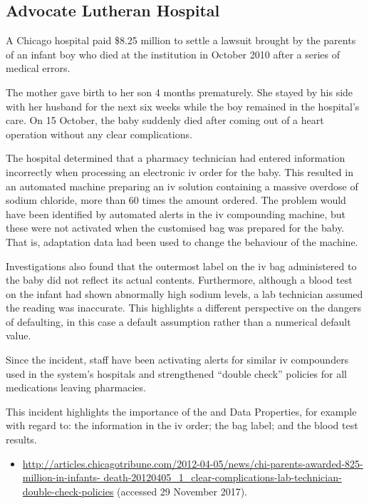 \subsection{Advocate Lutheran Hospital} \label{bkm:incacc:advocatelutheran}
A Chicago hospital paid \$8.25 million to settle a lawsuit brought by the parents of an infant boy who died at the institution in October 2010 after a series of medical errors.

The mother gave birth to her son 4 months prematurely. She stayed by his side with her husband for the next six weeks while the boy remained in the hospital's care. On 15 October, the baby suddenly died after coming out of a heart operation without any clear complications.

The hospital determined that a pharmacy technician had entered \gls{information} incorrectly when processing an electronic \gls{iv} order for the baby. This resulted in an automated machine preparing an \gls{iv} solution containing a massive overdose of sodium chloride, more than 60 times the amount ordered. The problem would have been identified by automated alerts in the \gls{iv} compounding machine, but these were not activated when the customised bag was prepared for the baby. That is, \gls{adaptation data} had been used to change the behaviour of the machine.

Investigations also found that the outermost label on the \gls{iv} bag administered to the baby did not reflect its actual contents. Furthermore, although a blood test on the infant had shown abnormally high sodium levels, a lab technician assumed the reading was inaccurate. This highlights a different perspective on the dangers of defaulting, in this case a default assumption rather than a numerical default value.

Since the incident, staff have been activating alerts for similar \gls{iv} compounders used in the system's hospitals and strengthened ``double check'' policies for all medications leaving pharmacies.

This incident highlights the importance of the  and  Data Properties, for example with regard to: the \gls{information} in the \gls{iv} order; the bag label; and the blood test results.

\begin{samepage}
\begin{itemize}
  \item \raggedright{\href{http://articles.chicagotribune.com/2012-04-05/news/chi-parents-awarded-825-million-in-infants-death-20120405_1_clear-complications-lab-technician-double-check-policies}{http://articles.chicagotribune.com/2012-04-05/news/chi-parents-awarded-825-million-in-infants- death-20120405\_1\_clear-complications-lab-technician-double-check-policies} (accessed 29 November 2017).}
\end{itemize}
\end{samepage}


